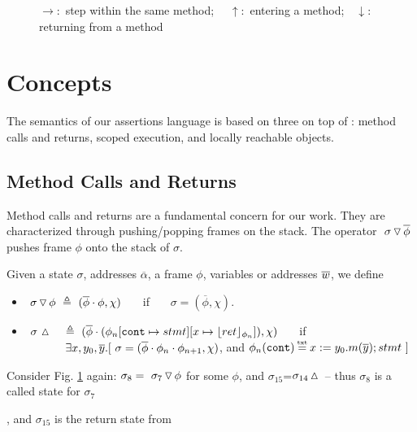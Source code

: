 {\begin{figure}[htb]
\begin{tabular}{|c|}
\end{tabular}
   \caption{$\rightarrow$:\  step within the same method; \ \ $\uparrow$:\    entering a method;\ \  $\downarrow$:  returning from a method}
   \label{fig:UpSemantics}
 \end{figure}
 

\section{ Concepts}
\label{s:auxiliary}

{The semantics of our assertions language %
is based on three   on  top of  \LangOO: {method calls and returns, scoped execution}, and locally reachable objects.}

\subsection{ Method Calls and Returns}
 
Method calls and returns are a fundamental concern for our work. 
They are characterized through pushing/popping   frames on the stack.  
The operator   $  \ {\sigma} \, {\triangledown}\, \overline{\phi} $ pushes 
frame $\phi$ onto the stack of $\sigma$.
 
 

\begin{definition}
\label{def:push:frame}
Given a state $\sigma$, addresses $\overline \alpha$, a frame $\phi$,  variables or addresses $\overline {w}$, we define
\begin{itemize}
\item
 $  \ {\sigma} \, {\triangledown}\, {\phi}  \ \triangleq \ ({\overline{\phi}\cdot\phi}, \chi)$ \ \ \  if \ \ \  $\sigma=(\overline{\phi}, \chi)$.
\item
$ \ \sigma\, \popSymbol \ \ \  \triangleq\   { (\overline{\phi}\cdot (\phi_n[\prg{cont}\mapsto stmt][x \mapsto \interpret {\phi_n}{ret}]), \chi)}$ \ \ \  if \\
 $\strut \hspace{1.2cm}  \exists x, y_0, \overline y. [ \ \sigma=(\overline{\phi}\cdot\phi_n\cdot\phi_{n+1}, \chi)$, and $\phi_n(\prg{cont})\txteq x:= y_0.m(\overline y); stmt \ ]$
\end{itemize}
 \end{definition}

Consider Fig. \ref{fig:UpSemantics} again: $\sigma_8 =  \ {\sigma_7} \, {\triangledown}\, {\phi} $ for some $\phi$, and  $\sigma_{15}$=$\sigma_{14} \, {\vartriangle}\,$
--  thus $\sigma_8$ is a called state for 
 $\sigma_7$}, and  $\sigma_{15}$ is the return state from 
